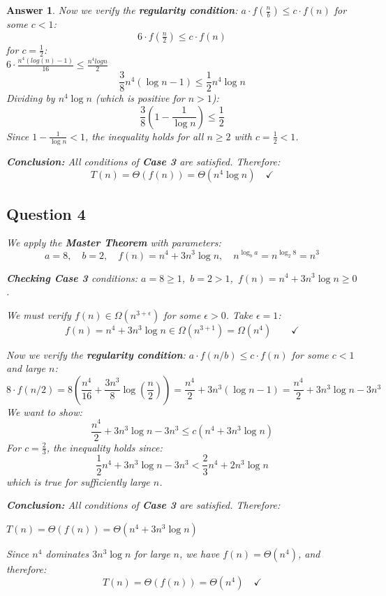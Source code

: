 \documentclass[a4paper]{article}
\theoremstyle{remarksStyle}
\theoremstyle{questionStyle}
\theoremstyle{answerStyle}
\newtheorem{answer}{Answer}
\begin{document}
\begin{answer}
Now we verify the \textbf{regularity condition}: $a \cdot f\!\left(\tfrac{n}{b}\right) \leq c \cdot f(n)$ for some $c < 1$:
\[
    6 \cdot f\!\left(\tfrac{n}{2}\right) \leq c \cdot f(n)
\]
for $c = \frac{1}{2}$:\\
$6 \cdot \frac{n^4(log(n)-1)}{16} \leq \frac{n^4logn}{2}$
\[
    \frac{3}{8} n^4 (\log n - 1) \leq \frac{1}{2} n^4 \log n
\]
Dividing by $n^4 \log n$ (which is positive for $n > 1$):
\[
    \frac{3}{8} \left( 1 - \frac{1}{\log n} \right) \leq \frac{1}{2}
\]
Since $1 - \frac{1}{\log n} < 1$, the inequality holds for all $n \ge 2$ with $c = \frac{1}{2} < 1$.

\medskip
\noindent\textbf{Conclusion:} 
All conditions of \textbf{Case 3} are satisfied. Therefore:
\[
    \boxed{T(n) = \Theta(f(n)) = \Theta(n^4 \log n)} \quad \checkmark
\]

\subsection*{Question 4}

We apply the \textbf{Master Theorem} with parameters:
\[
    a = 8, \quad b = 2, \quad f(n) = n^4 + 3n^3 \log n, \quad
    n^{\log_b a} = n^{\log_{2} 8} = n^3
\]

\noindent\textbf{Checking Case 3} conditions: $a = 8 \ge 1$,\ $b = 2 > 1$,\ $f(n) = n^4 + 3n^3 \log n \ge 0$.

We must verify $f(n) \in \Omega(n^{3+\epsilon})$ for some $\epsilon > 0$. Take $\epsilon = 1$:
\[
    f(n) = n^4 + 3n^3 \log n \in \Omega(n^{3+1}) = \Omega(n^4) \qquad \checkmark
\]

Now we verify the \textbf{regularity condition}: $a \cdot f(n/b) \leq c \cdot f(n)$ for some $c < 1$ and large $n$:
\[
    8 \cdot f(n/2) = 8 \left( \frac{n^4}{16} + \frac{3n^3}{8} \log\left(\frac{n}{2}\right) \right) = \frac{n^4}{2} + 3n^3(\log n - 1) = \frac{n^4}{2} + 3n^3 \log n - 3n^3
\]
We want to show:
\[
    \frac{n^4}{2} + 3n^3 \log n - 3n^3 \leq c(n^4 + 3n^3 \log n)
\]
For $c = \frac{2}{3}$, the inequality holds since:
\[
    \frac{1}{2}n^4 + 3n^3 \log n - 3n^3 < \frac{2}{3}n^4 + 2n^3 \log n
\]
which is true for sufficiently large $n$.

\medskip
\noindent\textbf{Conclusion:} 
All conditions of \textbf{Case 3} are satisfied. Therefore:
\begin{center}
    $T(n) = \Theta(f(n)) = \Theta(n^4 + 3n^3 \log n)$ 
\end{center}
Since $n^4$ dominates $3n^3\log n$ for large $n$, we have $f(n) = \Theta(n^4)$, and therefore:
\[
    \boxed{T(n) = \Theta(f(n)) = \Theta(n^4)} \quad \checkmark
\]


\end{answer}
\end{document}
